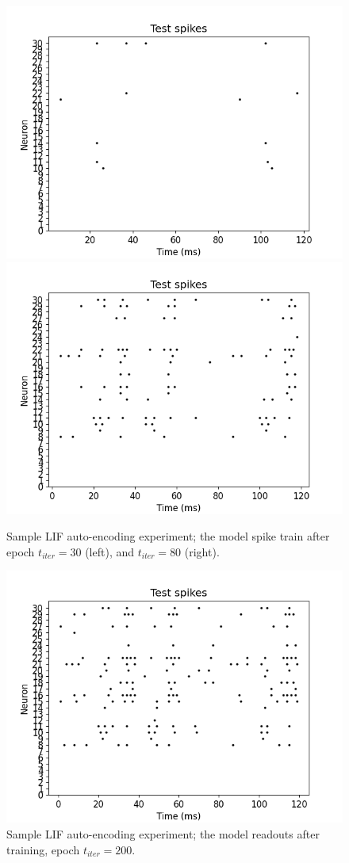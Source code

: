 \documentclass[mphil,deptreport,ianc]{infthesis} %
\begin{document}
\begin{figure}[!h]
    \centering
    \includegraphics[width=0.49\columnwidth]{figures/Supplementary/gating/LIF/AutoEncoding/01-04_16-35-37-680/test_plot_spikes_train_iter_30_LIF_23.png}
    \includegraphics[width=0.49\columnwidth]{figures/Supplementary/gating/LIF/AutoEncoding/01-04_16-35-37-680/test_plot_spikes_train_iter_80_LIF_23.png}
    
    \caption{Sample LIF auto-encoding experiment; the model spike train after epoch $t_{iter}=30$ (left), and $t_{iter}=80$ (right).}
    \label{fig:LIF_AE_1_readouts_t_i_30_and_80}
\end{figure}

\begin{figure}[!h]
    \centering
    \includegraphics[width=0.6\columnwidth]{figures/Supplementary/gating/LIF/AutoEncoding/01-04_16-35-37-680/test_plot_spikes_train_iter_199_LIF_23.png}
    \caption{Sample LIF auto-encoding experiment; the model readouts after training, epoch $t_{iter}=200$.}
    \label{fig:LIF_AE_1_loss_and_readouts}
\end{figure}
\end{document}
